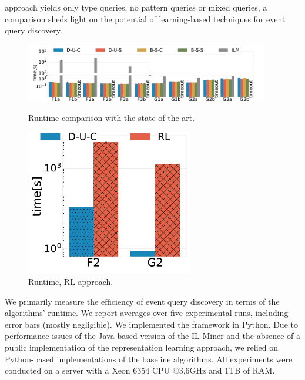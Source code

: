 approach
yields only type queries, no pattern queries or mixed queries, a comparison
sheds light on the potential of learning-based techniques for event query
discovery.
\begin{figure}
	\centering
	\begin{minipage}[c]{0.7\textwidth}
		\includegraphics[width=0.95\textwidth]{img/sota_4_broken_new.pdf}
		\vspace{-1em}
		\caption{Runtime comparison with the state of the art.}
	\label{fig:sota}
\end{minipage}
\begin{minipage}[c]{0.29\textwidth}
	\includegraphics[width=0.65\textwidth]{img/rl_compare.pdf}
	\vspace{-1em}
	\caption{Runtime, RL approach.}
	\label{fig:rl}
\end{minipage}
\vspace{-1em}
\end{figure}
 We primarily measure the efficiency of event query
discovery in terms of the algorithms' runtime. We report averages over five
experimental runs, including error bars (mostly negligible).
We implemented the \sys{} framework in Python. Due to performance issues
of the Java-based version of the IL-Miner and the
absence of a public implementation of the representation learning approach,
we relied on Python-based implementations of the baseline algorithms.
All experiments were conducted on a server with a Xeon 6354 CPU @3,6GHz and
1TB of RAM.
